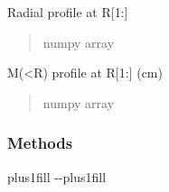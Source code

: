 \documentclass[a4paper,11pt,english]{sphinxmanual}
\begin{document}
\begin{fulllineitems}
\begin{fulllineitems}
\end{fulllineitems}



\begin{fulllineitems}

\pysigstartsignatures
\pysigline
{}
\pysigstopsignatures
\sphinxAtStartPar
Radial profile at R{[}1:{]}
\begin{quote}\begin{description}
\sphinxAtStartPar
numpy array

\end{description}\end{quote}

\end{fulllineitems}


\begin{fulllineitems}
\label{\detokenize{x22:disk_model.DiskModel.MR}}
\pysigstartsignatures
\pysigline
{}
\pysigstopsignatures
\sphinxAtStartPar
M(\textless{}R) profile at R{[}1:{]} (cm)
\begin{quote}\begin{description}
\sphinxAtStartPar
numpy array

\end{description}\end{quote}

\end{fulllineitems}

\subsubsection*{Methods}


\begin{savenotes}
\sphinxatlongtablestart
\sphinxthistablewithglobalstyle
\sphinxthistablewithnovlinesstyle
\makeatletter
  \LTleft \@totalleftmargin plus1fill
  \LTright\dimexpr\columnwidth-\@totalleftmargin-\linewidth\relax plus1fill
\makeatother
\begin{longtable}{}
\sphinxtoprule
\endfirsthead

\\
\sphinxtoprule
\endhead


\end{longtable}
\end{savenotes}
\end{fulllineitems}
\end{document}
